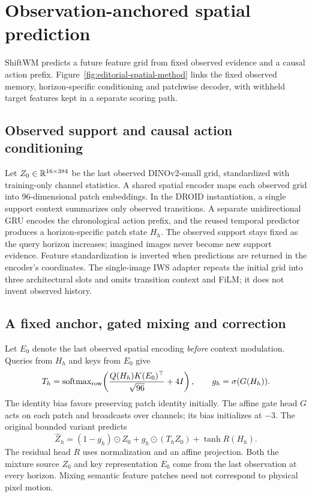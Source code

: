 \section{Observation-anchored spatial prediction}
\label{sec:editorial-method}
ShiftWM predicts a future feature grid from fixed observed evidence and a
causal action prefix. Figure~\ref{fig:editorial-spatial-method} links the fixed
observed memory, horizon-specific conditioning and patchwise decoder, with
withheld target features kept in a separate scoring path.



\subsection{Observed support and causal action conditioning}
Let $Z_0\in\mathbb{R}^{16\times384}$ be the last observed DINOv2-small grid,
standardized with training-only channel statistics. A shared spatial encoder
maps each observed grid into 96-dimensional patch embeddings. In the DROID instantiation, a single
support context summarizes only observed transitions. A separate
unidirectional GRU encodes the chronological action prefix, and the reused
temporal predictor produces a horizon-specific patch state $H_h$.
The observed support stays fixed as the query horizon increases; imagined
images never become new support evidence. Feature standardization is inverted
when predictions are returned in the encoder's coordinates.
The single-image IWS adapter repeats the initial grid into three architectural
slots and omits transition context and FiLM; it does not invent observed history.

\subsection{A fixed anchor, gated mixing and correction}
Let $E_0$ denote the last observed spatial encoding \emph{before} context
modulation. Queries from $H_h$ and keys from $E_0$ give
\begin{equation}
 T_h=\operatorname{softmax}_{\rm row}\!\left(
 \frac{Q(H_h)K(E_0)^\top}{\sqrt{96}}+4I\right),\qquad
 g_h=\sigma(G(H_h)).
 \label{eq:editorial-mixing}
\end{equation}
The identity bias favors preserving patch identity initially. The affine
gate head $G$ acts on each patch and broadcasts over channels; its bias
initializes at $-3$.
The original bounded variant predicts
\begin{equation}
 \widehat Z_h=(1-g_h)\odot Z_0+
 g_h\odot(T_hZ_0)+\tanh R(H_h).
 \label{eq:editorial-forecast}
\end{equation}
The residual head $R$ uses normalization and an affine projection. Both the
mixture source $Z_0$ and key representation $E_0$ come from the last observation
at every horizon. Mixing semantic feature patches need not correspond to
physical pixel motion.

